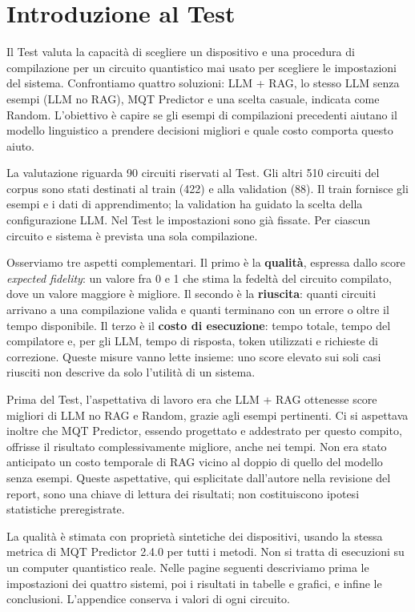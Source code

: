 \section{Introduzione al Test}
Il Test valuta la capacità di scegliere un dispositivo e una procedura di
compilazione per un circuito quantistico mai usato per scegliere le impostazioni
del sistema. Confrontiamo quattro soluzioni: LLM + RAG, lo stesso LLM senza
esempi (LLM no RAG), MQT Predictor e una scelta casuale, indicata come Random.
L'obiettivo è capire se gli esempi di compilazioni precedenti aiutano il modello
linguistico a prendere decisioni migliori e quale costo comporta questo aiuto.

La valutazione riguarda 90 circuiti riservati al Test. Gli altri 510 circuiti
del corpus sono stati destinati al train (422) e alla validation (88).
Il train fornisce gli esempi e i dati di apprendimento; la validation ha guidato
la scelta della configurazione LLM. Nel Test le impostazioni sono già fissate.
Per ciascun circuito e sistema è prevista una sola compilazione.

Osserviamo tre aspetti complementari. Il primo è la \textbf{qualità}, espressa
dallo score \emph{expected fidelity}: un valore fra 0 e 1 che stima la fedeltà
del circuito compilato, dove un valore maggiore è migliore. Il secondo è la
\textbf{riuscita}: quanti circuiti arrivano a una compilazione valida e quanti
terminano con un errore o oltre il tempo disponibile. Il terzo è il
\textbf{costo di esecuzione}: tempo totale, tempo del compilatore e, per gli
LLM, tempo di risposta, token utilizzati e richieste di correzione.
Queste misure vanno lette insieme: uno score elevato sui soli casi riusciti
non descrive da solo l'utilità di un sistema.

Prima del Test, l'aspettativa di lavoro era che LLM + RAG ottenesse score
migliori di LLM no RAG e Random, grazie agli esempi pertinenti. Ci si aspettava
inoltre che MQT Predictor, essendo progettato e addestrato per questo compito,
offrisse il risultato complessivamente migliore, anche nei tempi.
Non era stato anticipato un costo temporale di RAG vicino al doppio di quello
del modello senza esempi. Queste aspettative, qui esplicitate dall'autore
nella revisione del report, sono una chiave di lettura dei risultati;
non costituiscono ipotesi statistiche preregistrate.

La qualità è stimata con proprietà sintetiche dei dispositivi, usando la stessa
metrica di MQT Predictor 2.4.0 per tutti i metodi. Non si tratta di esecuzioni
su un computer quantistico reale. Nelle pagine seguenti descriviamo prima
le impostazioni dei quattro sistemi, poi i risultati in tabelle e grafici,
e infine le conclusioni. L'appendice conserva i valori di ogni circuito.

